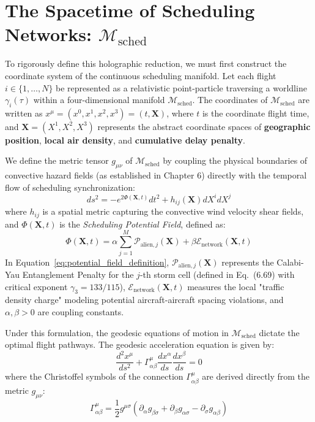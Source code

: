 \documentclass[11pt,a4paper]{book}
\begin{document}
\section{The Spacetime of Scheduling Networks: $\mathcal{M}_{\text{sched}}$}\label{sec:spacetime_scheduling}

To rigorously define this holographic reduction, we must first construct the coordinate system of the continuous scheduling manifold. Let each flight $i \in \{1, \dots, N\}$ be represented as a relativistic point-particle traversing a worldline $\gamma_i(\tau)$ within a four-dimensional manifold $\mathcal{M}_{\text{sched}}$. The coordinates of $\mathcal{M}_{\text{sched}}$ are written as $x^\mu = (x^0, x^1, x^2, x^3) = (t, \mathbf{X})$, where $t$ is the coordinate flight time, and $\mathbf{X} = (X^1, X^2, X^3)$ represents the abstract coordinate spaces of \textbf{geographic position}, \textbf{local air density}, and \textbf{cumulative delay penalty}.

We define the metric tensor $g_{\mu\nu}$ of $\mathcal{M}_{\text{sched}}$ by coupling the physical boundaries of convective hazard fields (as established in Chapter 6) directly with the temporal flow of scheduling synchronization:
\begin{equation}
\label{eq:scheduling_metric}
ds^2 = - e^{2\Phi(\mathbf{X}, t)} dt^2 + h_{ij}(\mathbf{X}) dX^i dX^j
\end{equation}
where $h_{ij}$ is a spatial metric capturing the convective wind velocity shear fields, and $\Phi(\mathbf{X}, t)$ is the \textit{Scheduling Potential Field}, defined as:
\begin{equation}
\label{eq:potential_field_definition}
\Phi(\mathbf{X}, t) = \alpha \sum_{j=1}^{M} \mathcal{P}_{\text{alien}, j}(\mathbf{X}) + \beta \mathcal{E}_{\text{network}}(\mathbf{X}, t)
\end{equation}
In Equation~\eqref{eq:potential_field_definition}, $\mathcal{P}_{\text{alien}, j}(\mathbf{X})$ represents the Calabi-Yau Entanglement Penalty for the $j$-th storm cell (defined in Eq.~(6.69) with critical exponent $\gamma_3 = 133/115$), $\mathcal{E}_{\text{network}}(\mathbf{X}, t)$ measures the local "traffic density charge" modeling potential aircraft-aircraft spacing violations, and $\alpha, \beta > 0$ are coupling constants.

Under this formulation, the geodesic equations of motion in $\mathcal{M}_{\text{sched}}$ dictate the optimal flight pathways. The geodesic acceleration equation is given by:
\begin{equation}
\label{eq:sched_geodesic_eq}
\frac{d^2 x^\mu}{ds^2} + \Gamma^\mu_{\alpha\beta} \frac{dx^\alpha}{ds} \frac{dx^\beta}{ds} = 0
\end{equation}
where the Christoffel symbols of the connection $\Gamma^\mu_{\alpha\beta}$ are derived directly from the metric $g_{\mu\nu}$:
\begin{equation}
\label{eq:christoffel_sched}
\Gamma^\mu_{\alpha\beta} = \frac{1}{2} g^{\mu\sigma} \left( \partial_\alpha g_{\beta\sigma} + \partial_\beta g_{\alpha\sigma} - \partial_\sigma g_{\alpha\beta} \right)
\end{equation}
\end{document}
